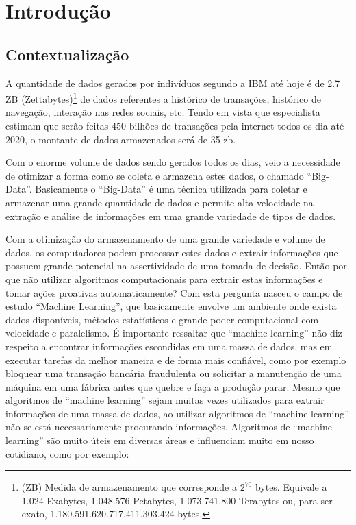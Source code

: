 \chapter{Introdução}
\label{cap:introducao}

\section{Contextualização}
\label{sec:contextualizacao}
	A quantidade de dados gerados por indivíduos segundo a IBM até hoje é de 2.7 ZB (Zettabytes)\footnote{(ZB) Medida de armazenamento que corresponde a $2^{70}$ bytes. Equivale a 1.024 Exabytes,
1.048.576 Petabytes, 1.073.741.800 Terabytes ou, para ser exato, 1.180.591.620.717.411.303.424 bytes.} de dados referentes a histórico de transações, histórico de navegação, interação nas redes sociais, etc. Tendo em vista que especialista estimam que serão feitas 450 bilhões de transações pela internet todos os dia até 2020, o montante de dados armazenados será de 35 zb.

	Com o enorme volume de dados sendo gerados todos os dias, veio a necessidade de otimizar a forma como se coleta e armazena estes dados, o chamado “Big-Data”. Basicamente o “Big-Data” é uma técnica utilizada para coletar e armazenar uma grande quantidade de dados e permite alta velocidade na extração e análise de informações em uma grande variedade de tipos de dados. 

	Com a otimização do armazenamento de uma grande variedade e volume de dados, os computadores podem processar estes dados e extrair informações que possuem grande potencial na assertividade de uma tomada de decisão. Então por que não utilizar algoritmos computacionais para extrair estas informações e tomar ações proativas automaticamente? Com esta pergunta nasceu o campo de estudo “Machine Learning”, que basicamente envolve um ambiente onde exista dados disponíveis, métodos estatísticos e grande poder computacional com velocidade e paralelismo. 
	É importante ressaltar que “machine learning” não diz respeito a encontrar informações escondidas em uma massa de dados, mas em executar tarefas da melhor maneira e de forma mais confiável, como por exemplo bloquear uma transação bancária fraudulenta ou solicitar a manutenção de uma máquina em uma fábrica antes que quebre e faça a produção parar. Mesmo que algoritmos de “machine learning” sejam muitas vezes utilizados para extrair informações de uma massa de dados, ao utilizar algoritmos de “machine learning” não se está necessariamente procurando informações. Algoritmos de “machine learning” são muito úteis em diversas áreas e influenciam muito em nosso cotidiano, como por exemplo:

